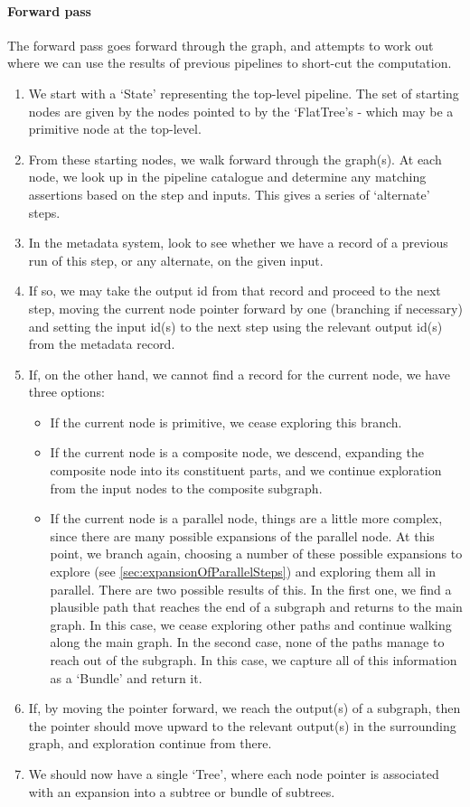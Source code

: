 \documentclass[10pt,a4paper]{article}
\begin{document}
\begin{appendices}
\paragraph{Forward pass}
The forward pass goes forward through the graph, and attempts to work out where we can use the results of previous pipelines to short-cut the computation.
\begin{enumerate}
\item We start with a `State' representing the top-level pipeline. The set of starting nodes are given by the nodes pointed to by the `FlatTree's - which may be a primitive node at the top-level.
\item From these starting nodes, we walk forward through the graph(s). At each node, we look up in the pipeline catalogue and determine any matching assertions based on the step and inputs. This gives a series of `alternate' steps.
\item In the metadata system, look to see whether we have a record of a previous run of this step, or any alternate, on the given input.
\item If so, we may take the output id from that record and proceed to the next step, moving the current node pointer forward by one (branching if necessary) and setting the input id(s) to the next step using the relevant output id(s) from the metadata record.
\item If, on the other hand, we cannot find a record for the current node, we have three options:
\begin{itemize}
\item If the current node is primitive, we cease exploring this branch.
\item If the current node is a composite node, we descend, expanding the composite node into its constituent parts, and we continue exploration from the input nodes to the composite subgraph.
\item If the current node is a parallel node, things are a little more complex, since there are many possible expansions of the parallel node. At this point, we branch again, choosing a number of these possible expansions to explore (see \ref{sec:expansionOfParallelSteps}) and exploring them all in parallel. There are two possible results of this. In the first one, we find a plausible path that reaches the end of a subgraph and returns to the main graph. In this case, we cease exploring other paths and continue walking along the main graph. In the second case, none of the paths manage to reach out of the subgraph. In this case, we capture all of this information as a `Bundle' and return it.
\end{itemize}
\item If, by moving the pointer forward, we reach the output(s) of a subgraph, then the pointer should move upward to the relevant output(s) in the surrounding graph, and exploration continue from there.
\item We should now have a single `Tree', where each node pointer is associated with an expansion into a subtree or bundle of subtrees.
\end{enumerate}


\end{appendices}
\end{document}
